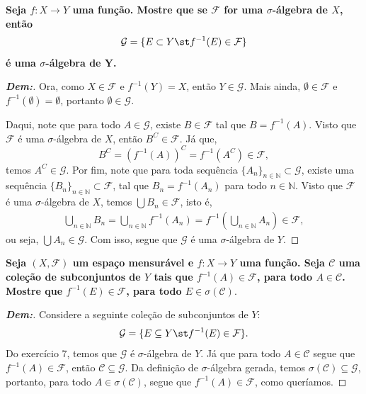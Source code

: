 \biglinend
{}
\bigline
\textbf{Seja $f:X \rightarrow Y$ uma função. Mostre que se $\mathcal F$ 
for uma $\sigma$-álgebra de $X$, então 
$$\mathcal G = \{E \subset Y\st  f^{-1}(E)\in \mathcal F\}$$ 
é uma $\sigma$-álgebra de Y.
}
\begin{proof}[\textbf{Dem:}]
  Ora, como $X \in \mathcal F$ e $f^{-1}(Y) = X$, então $Y \in \mathcal G$. Mais ainda, 
  $\emptyset \in \mathcal F$ e $f^{-1}(\emptyset) = \emptyset$, portanto $\emptyset \in \mathcal G$.

  Daqui, note que para todo $A \in \mathcal G$, existe $B \in \mathcal F$ tal que $B = f^{-1}(A)$. 
  Visto que $\mathcal F$ é uma $\sigma$-álgebra de $X$, então $B^C \in \mathcal F$. Já que, 
  $$B^C = (f^{-1}(A))^C = f^{-1}\left(A^C\right) \in \mathcal F,$$
  temos $A^C \in \mathcal G$. Por fim, note que para toda sequência $\{A_n\}_{n\in \mathbb N} \subset \mathcal G$,
  existe uma sequência $\{B_n\}_{n \in \mathbb N} \subset \mathcal F$, tal que
  $B_n = f^{-1}(A_n)$ para todo $n \in \mathbb N$. Visto que $\mathcal F$ é uma $\sigma$-álgebra de $X$, temos 
  $\bigcup B_n \in \mathcal F$, isto é,
  \begin{align*}
    \bigcup\limits_{n \in \mathbb N} B_n = \bigcup\limits_{n \in \mathbb N} f^{-1}(A_n) = 
    f^{-1}\left(\bigcup\limits_{n \in \mathbb N} A_n\right) \in \mathcal F,
  \end{align*}
 ou seja, $\bigcup A_n \in \mathcal G$. Com isso, segue que $\mathcal G$ é uma $\sigma$-álgebra de $Y$.
\end{proof}

\biglinend
\newpage
{}
\bigline
\textbf{Seja $(X, \mathcal F)$ um espaço mensurável e $f: X \rightarrow Y$ uma função. Seja $\mathcal C$ uma coleção de 
subconjuntos de $Y$ tais que $f^{-1}(A) \in \mathcal F$, para todo $A \in \mathcal C$. Mostre que $f^{-1}(E) \in \mathcal F$, 
para todo $E \in \sigma(\mathcal C)$}.
\begin{proof}[\textbf{Dem:}] Considere a seguinte coleção de subconjuntos de $Y$:
  \begin{align*}
    \mathcal G = \{E\subseteq Y\st  f^{-1}(E) \in \mathcal F\}.
  \end{align*}
  Do exercício 7, temos que $\mathcal G$ é $\sigma$-álgebra de $Y$. Já que 
  para todo $A \in \mathcal C$ segue que $f^{-1}(A) \in \mathcal F$,
  então $\mathcal C \subseteq \mathcal G$. Da definição de $\sigma$-álgebra gerada, 
  temos $\sigma(\mathcal C) \subseteq \mathcal G$, portanto, para todo 
  $A \in \sigma(\mathcal C)$, segue que $f^{-1}(A) \in \mathcal F$, como queríamos. 
\end{proof}


